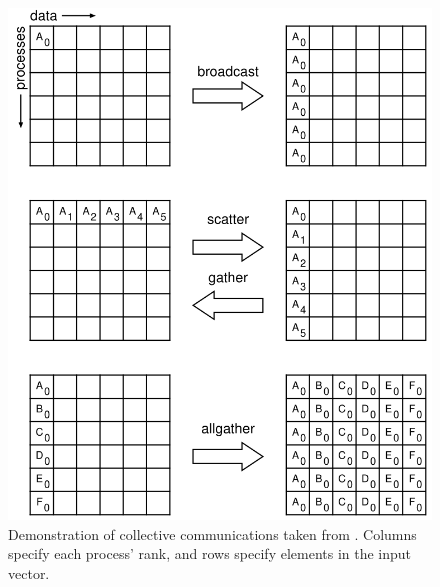 \begin{figure}
	\centering
	\includegraphics[width = 4.5in]{3_Chapters/2_Chapter_Background/Figs/mpispec_collective.png}
	\caption[Demonstration of collective communications]{
     Demonstration of collective communications taken from \cite{mpi40}.
     Columns specify each process' rank, and rows specify elements in the input vector.
     }
	\label{fig:mpispec_collectives}
\end{figure}
